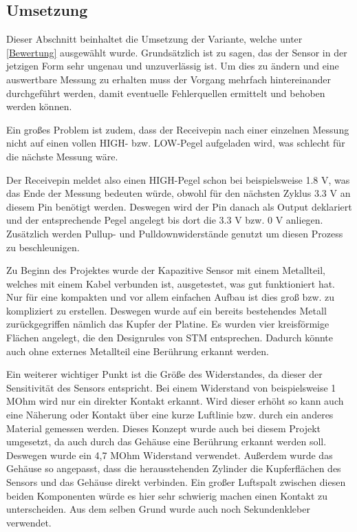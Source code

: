\documentclass[a4paper,
DIV=13,
12pt,
BCOR=10mm,
department=FakEI,
parskip=half,
automark,
]{article}
\begin{document}
\subsection{Umsetzung}
Dieser Abschnitt beinhaltet die Umsetzung der Variante, welche unter \ref{Bewertung} ausgewählt wurde. Grundsätzlich ist zu sagen, das der Sensor in der jetzigen Form sehr ungenau und unzuverlässig ist. Um dies zu ändern und eine auswertbare Messung zu erhalten muss der Vorgang mehrfach hintereinander durchgeführt werden, damit eventuelle Fehlerquellen ermittelt und behoben werden können. 

Ein großes Problem ist zudem, dass der Receivepin nach einer einzelnen Messung nicht auf einen vollen HIGH- bzw. LOW-Pegel aufgeladen wird, was schlecht für die nächste Messung wäre.

Der Receivepin meldet also einen HIGH-Pegel schon bei beispielsweise 1.8 V, was das Ende der Messung bedeuten würde, obwohl für den nächsten Zyklus 3.3 V an diesem Pin benötigt werden. Deswegen wird der Pin danach als Output deklariert und der entsprechende Pegel angelegt bis dort die 3.3 V bzw. 0 V anliegen. Zusätzlich werden Pullup- und Pulldownwiderstände genutzt um diesen Prozess zu beschleunigen. 

Zu Beginn des Projektes wurde der Kapazitive Sensor mit einem Metallteil, welches mit einem Kabel verbunden ist, ausgetestet, was gut funktioniert hat. Nur für eine kompakten und vor allem einfachen Aufbau ist dies groß bzw. zu kompliziert zu erstellen. Deswegen wurde auf ein bereits bestehendes Metall zurückgegriffen nämlich das Kupfer der Platine. Es wurden vier kreisförmige Flächen angelegt, die den Designrules 
von STM entsprechen. Dadurch könnte auch ohne externes Metallteil eine Berührung erkannt werden.

Ein weiterer wichtiger Punkt ist die Größe des Widerstandes, da dieser der Sensitivität des Sensors entspricht. Bei einem Widerstand von beispielsweise 1 MOhm wird nur ein direkter Kontakt erkannt. Wird dieser erhöht so kann auch eine Näherung oder Kontakt über eine kurze Luftlinie bzw. durch ein anderes Material gemessen werden. Dieses Konzept wurde auch bei diesem Projekt umgesetzt, da auch durch das Gehäuse eine Berührung erkannt werden soll. Deswegen wurde ein 4,7 MOhm Widerstand verwendet. Außerdem wurde das Gehäuse so angepasst, dass die herausstehenden Zylinder die Kupferflächen des Sensors und das Gehäuse direkt verbinden. Ein großer Luftspalt zwischen diesen beiden Komponenten würde es hier sehr schwierig machen einen Kontakt zu unterscheiden. Aus dem selben Grund wurde auch noch Sekundenkleber verwendet. 
\end{document}
